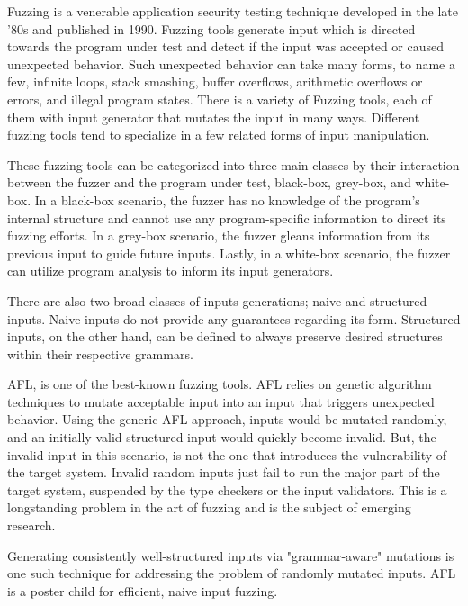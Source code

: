 \documentclass[12pt]{diazessay}
\begin{document}
Fuzzing is a venerable application security testing technique developed in the late '80s\cite{Barton1988} and published in 1990\cite{Miller1990}.
Fuzzing tools generate input which is directed towards the program under test and detect if the input was accepted or caused unexpected behavior.
Such unexpected behavior can take many forms, to name a few, infinite loops, stack smashing, buffer overflows, arithmetic overflows or errors, and illegal program states.
There is a variety of Fuzzing tools\cite{ModelBasedFuzzing}\cite{GrammarBasedFuzzing}\cite{ProtocolBasedFuzzing}, each of them with input generator that mutates the input in many ways.
Different fuzzing tools tend to specialize in a few related forms of input\cite{InputDiversity} manipulation.

These fuzzing tools can be categorized into three main classes by their interaction between the fuzzer and the program under test, black-box\cite{takanen2018fuzzing}, grey-box, and white-box\cite{fuzzingsurvey}.
In a black-box scenario, the fuzzer has no knowledge of the program's internal structure and cannot use any program-specific information to direct its fuzzing efforts.
In a grey-box scenario, the fuzzer gleans information from its previous input to guide future inputs.
Lastly, in a white-box scenario, the fuzzer can utilize program analysis to inform its input generators.

There are also two broad classes of inputs generations; naive and structured\cite{fuzzingsurvey} inputs.
Naive inputs do not provide any guarantees regarding its form.
Structured inputs, on the other hand, can be defined to always preserve desired structures within their respective grammars.

AFL\cite{AFL_page}, is one of the best-known fuzzing tools. AFL relies on genetic algorithm techniques\cite{InputMutationAlgorithm} to mutate acceptable input into an input that triggers unexpected behavior.
Using the generic AFL approach, inputs would be mutated randomly, and an initially valid structured input would quickly become invalid.
But, the invalid input in this scenario, is not the one that introduces the vulnerability of the target system.
Invalid random inputs just fail to run the major part of the target system, suspended by the type checkers or the input validators.
This is a longstanding problem in the art of fuzzing and is the subject of emerging research.

Generating consistently well-structured inputs\cite{structuredInput} via "grammar-aware" mutations is one such technique for addressing the problem of randomly mutated inputs.
AFL is a poster child for efficient, naive input fuzzing.
\end{document}
